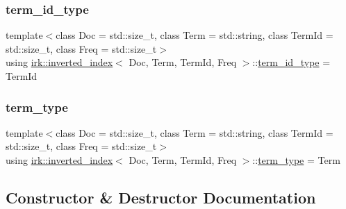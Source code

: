 \subsubsection{\texorpdfstring{term\+\_\+id\+\_\+type}{term\_id\_type}}
{\footnotesize\ttfamily template$<$class Doc  = std\+::size\+\_\+t, class Term  = std\+::string, class Term\+Id  = std\+::size\+\_\+t, class Freq  = std\+::size\+\_\+t$>$ \\
using \mbox{\hyperlink{classirk_1_1inverted__index}{irk\+::inverted\+\_\+index}}$<$ Doc, Term, Term\+Id, Freq $>$\+::\mbox{\hyperlink{classirk_1_1inverted__index_aac7579f5261c795a6f19a7f700b57b2b}{term\+\_\+id\+\_\+type}} =  Term\+Id}

\mbox{\label{classirk_1_1inverted__index_a7a60c2cec1774c08f21e8e27ccb5ac33}} 
\subsubsection{\texorpdfstring{term\+\_\+type}{term\_type}}
{\footnotesize\ttfamily template$<$class Doc  = std\+::size\+\_\+t, class Term  = std\+::string, class Term\+Id  = std\+::size\+\_\+t, class Freq  = std\+::size\+\_\+t$>$ \\
using \mbox{\hyperlink{classirk_1_1inverted__index}{irk\+::inverted\+\_\+index}}$<$ Doc, Term, Term\+Id, Freq $>$\+::\mbox{\hyperlink{classirk_1_1inverted__index_a7a60c2cec1774c08f21e8e27ccb5ac33}{term\+\_\+type}} =  Term}



\subsection{Constructor \& Destructor Documentation}
\mbox{\label{classirk_1_1inverted__index_aeac9d91ff26a573b8c6aa7f28918a5d7}} 
